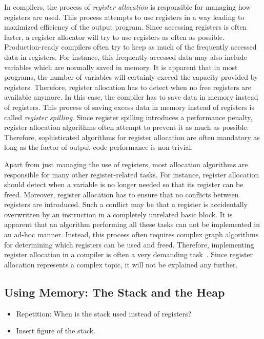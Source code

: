 In compilers, the process of \emph{register allocation} is responsible for managing how registers are used.
This process attempts to use registers in a way leading to maximized efficiency of the output program.
Since accessing registers is often faster, a register allocator will try to use registers as often as possible.
Production-ready compilers often try to keep as much of the frequently accessed data in registers.
For instance, this frequently accessed data may also include variables which are normally saved in memory.
It is apparent that in most programs, the number of variables will certainly exceed the capacity provided by registers.
Therefore, register allocation has to detect when no free registers are available anymore.
In this case, the compiler has to save data in memory instead of registers.
This process of saving excess data in memory instead of registers is called \emph{register spilling}.
Since register spilling introduces a performance penalty, register allocation algorithms often attempt to prevent it as much as possible.
Therefore, sophisticated algorithms for register allocation are often mandatory as long as the factor of output code performance is non-trivial.

Apart from just managing the use of registers, most allocation algorithms are responsible for many other register-related tasks.
For instance, register allocation should detect when a variable is no longer needed so that its register can be freed.
Moreover, register allocation has to ensure that no conflicts between registers are introduced.
Such a conflict may be that a register is accidentally overwritten by an instruction in a completely unrelated basic block.
It is apparent that an algorithm performing all these tasks can not be implemented in an ad-hoc manner.
Instead, this process often requires complex graph algorithms for determining which registers can be used and freed.
Therefore, implementing register allocation in a compiler is often a very demanding task~\cite[pp.212-214]{Watson2017}.
Since register allocation represents a complex topic, it will not be explained any further.

\subsection{Using Memory: The Stack and the Heap}

\begin{itemize}
	\item Repetition: When is the stack used instead of registers?
	\item Insert figure of the stack.
\end{itemize}

